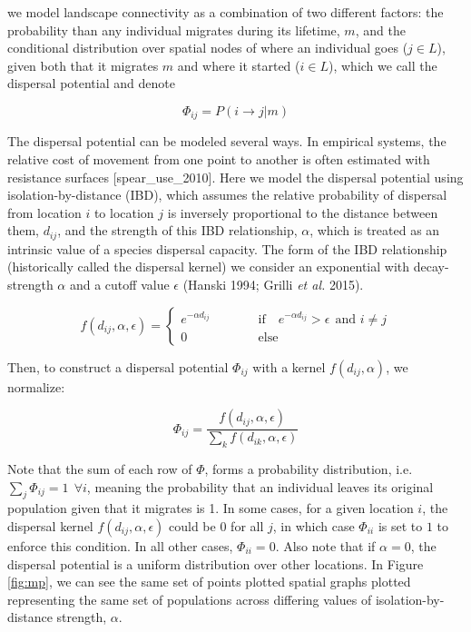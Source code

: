 \documentclass[10pt,oneside]{article}
\begin{document}
we model landscape connectivity as a combination of two different
factors: the probability than any individual migrates during its
lifetime, \(m\), and the conditional distribution over spatial nodes of
where an individual goes (\(j \in L\)), given both that it migrates
\(m\) and where it started (\(i \in L\)), which we call the dispersal
potential and denote

\[\Phi_{ij} =  P(i \to j | m)\]

The dispersal potential can be modeled several ways. In empirical
systems, the relative cost of movement from one point to another is
often estimated with resistance surfaces {[}spear\_use\_2010{]}. Here we
model the dispersal potential using isolation-by-distance (IBD), which
assumes the relative probability of dispersal from location \(i\) to
location \(j\) is inversely proportional to the distance between them,
\(d_{ij}\), and the strength of this IBD relationship, \(\alpha\), which
is treated as an intrinsic value of a species dispersal capacity. The
form of the IBD relationship (historically called the dispersal kernel)
we consider an exponential with decay-strength \(\alpha\) and a cutoff
value \(\epsilon\) (Hanski 1994; Grilli \emph{et al.} 2015).

\[f(d_{ij}, \alpha, \epsilon) =  \begin{cases} e^{-\alpha d_{ij}}
\quad\quad\quad &\text{if}\quad e^{-\alpha d_{ij}} > \epsilon \ \
\text{and } i \neq j \\   0 &\text{else} \end{cases}\]

Then, to construct a dispersal potential \(\Phi_{ij}\) with a kernel
\(f(d_{ij}, \alpha)\), we normalize:

\[\Phi_{ij} = \frac{f(d_{ij}, \alpha, \epsilon)}{\sum_k
f(d_{ik},\alpha, \epsilon)}\]

Note that the sum of each row of \(\Phi\), forms a probability
distribution, i.e.~\(\sum_j \Phi_{ij} = 1 \ \ \forall i\), meaning the
probability that an individual leaves its original population given that
it migrates is 1. In some cases, for a given location \(i\), the
dispersal kernel \(f(d_{ij}, \alpha, \epsilon)\) could be \(0\) for all
\(j\), in which case \(\Phi_{ii}\) is set to \(1\) to enforce this
condition. In all other cases, \(\Phi_{ii}=0\). Also note that if
\(\alpha=0\), the dispersal potential is a uniform distribution over
other locations. In Figure \ref{fig:mp}, we can see the same set of
points plotted spatial graphs plotted representing the same set of
populations across differing values of isolation-by-distance strength,
\(\alpha\).
\end{document}
